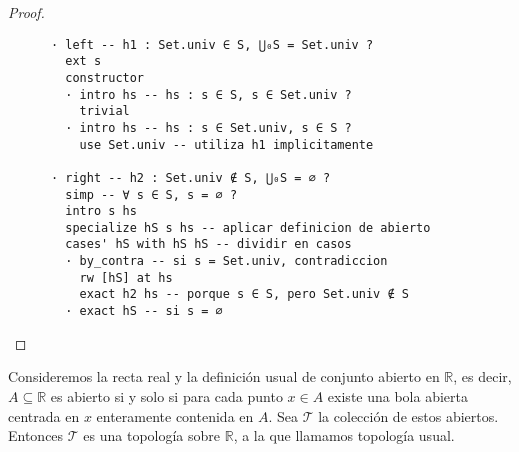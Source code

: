\begin{proof}
\begin{lstlisting}
      · left -- h1 : Set.univ ∈ S, ⋃₀S = Set.univ ?
        ext s
        constructor
        · intro hs -- hs : s ∈ S, s ∈ Set.univ ?
          trivial
        · intro hs -- hs : s ∈ Set.univ, s ∈ S ?
          use Set.univ -- utiliza h1 implicitamente

      · right -- h2 : Set.univ ∉ S, ⋃₀S = ∅ ?
        simp -- ∀ s ∈ S, s = ∅ ?
        intro s hs
        specialize hS s hs -- aplicar definicion de abierto
        cases' hS with hS hS -- dividir en casos
        · by_contra -- si s = Set.univ, contradiccion
          rw [hS] at hs 
          exact h2 hs -- porque s ∈ S, pero Set.univ ∉ S
        · exact hS -- si s = ∅ \end{lstlisting}
\end{proof}


\begin{example}

  Consideremos la recta real y la definición usual de conjunto abierto en $\mathbb{R}$, es decir, $A \subseteq \mathbb{R}$ es abierto si y solo si para cada punto $x \in A$ existe una bola abierta centrada en $x$ enteramente contenida en $A$. Sea $\mathcal{T}$ la colección de estos abiertos. Entonces $\mathcal{T}$ es una topología sobre $\mathbb{R}$, a la que llamamos \textnormal{topología usual}.
\end{example}

